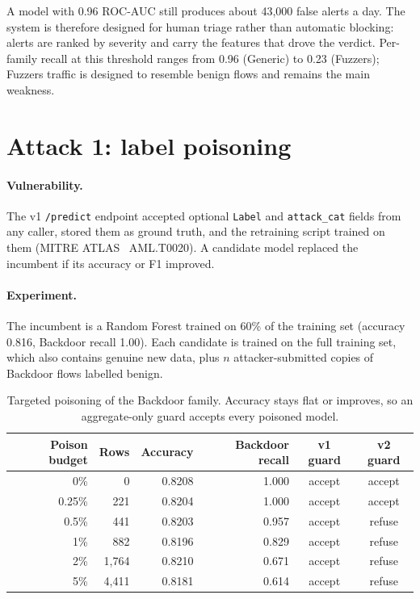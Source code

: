 \documentclass[11pt,a4paper]{article}
\newcommand{\code}[1]{\texttt{#1}}
\begin{document}
A model with 0.96 ROC-AUC still produces about 43,000 false alerts a day.
The system is therefore designed for human triage rather than automatic
blocking: alerts are ranked by severity and carry the features that drove
the verdict. Per-family recall at this threshold ranges from 0.96 (Generic)
to 0.23 (Fuzzers); Fuzzers traffic is designed to resemble benign flows and
remains the main weakness.

\section{Attack 1: label poisoning}
\label{sec:poisoning}

\paragraph{Vulnerability.} The v1 \code{/predict} endpoint accepted optional
\code{Label} and \code{attack\_cat} fields from any caller, stored them as
ground truth, and the retraining script trained on them (MITRE ATLAS~\cite{atlas}
AML.T0020). A candidate model replaced the incumbent if its accuracy or F1
improved.

\paragraph{Experiment.} The incumbent is a Random Forest trained on 60\% of
the training set (accuracy 0.816, Backdoor recall 1.00). Each candidate is
trained on the full training set, which also contains genuine new data, plus
$n$ attacker-submitted copies of Backdoor flows labelled benign.

\begin{table}[h]
\centering
\small
\caption{Targeted poisoning of the Backdoor family. Accuracy stays flat or
improves, so an aggregate-only guard accepts every poisoned model.}
\label{tab:poison}
\begin{tabular}{@{}rrrrcc@{}}
\toprule
Poison budget & Rows & Accuracy & Backdoor recall & v1 guard & v2 guard \\
\midrule
0\%    & 0     & 0.8208 & 1.000 & accept & accept \\
0.25\% & 221   & 0.8204 & 1.000 & accept & accept \\
0.5\%  & 441   & 0.8203 & 0.957 & accept & refuse \\
1\%    & 882   & 0.8196 & 0.829 & accept & refuse \\
2\%    & 1,764 & 0.8210 & 0.671 & accept & refuse \\
5\%    & 4,411 & 0.8181 & 0.614 & accept & refuse \\
\bottomrule
\end{tabular}
\end{table}
\end{document}

